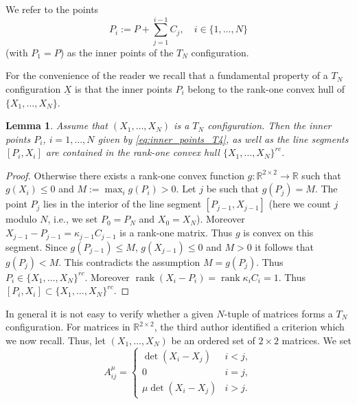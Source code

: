 \documentclass[titlepage]{amsart}
\numberwithin{equation}{section}
\theoremstyle{plain}
\newtheorem{lemma}[equation]{Lemma}
\theoremstyle{definition}
\theoremstyle{remark}
\newcommand{\R}{\mathbb{R}}
\newcommand{\rank}{\operatorname{rank}}
\begin{document}
\medskip




We refer to the points
\begin{equation}  \label{eq:inner_points_T4}
P_i := P + \sum_{j=1}^{i-1} C_j, \quad i \in \{1, \ldots,  N\}
\end{equation}
(with $P_1 = P$)
as the inner points of the $T_N$ configuration. 

For the convenience of the reader we recall that a  fundamental property of a $T_N$ configuration $\underline X$ is that the inner points $P_i$  belong to the rank-one convex hull of $\{ X_1, \ldots, X_N\}$.
  \begin{lemma}  \label{l:TNrc}
Assume that $(X_1, \ldots, X_N)$ is a $T_N$ configuration. Then the inner points $P_i$, $i=1,\dots,N$ given by
  \eqref{eq:inner_points_T4}, as well as the line segments $[P_i,X_i]$ are contained in the rank-one convex 
hull $\{X_1, \dots,X_N\}^{rc}$.
\end{lemma}

\begin{proof} 
Otherwise there exists a rank-one convex function $g:  \R^{2 \times 2} \to \R$ such that 
$g(X_i) \le 0$  and $M:= \max_i g(P_i) > 0$. Let $j$ be such that $g(P_j) = M.$
The point  $P_j$ lies in the interior of the line segment $[P_{j-1}, X_{j-1}]$  (here we count $j$ modulo $N$, i.e.,
  we set $P_0 = P_N$ and $X_0 = X_N$).
 Moreover $X_{j-1} - P_{j-1} = \kappa_{j-1} C_{j-1}$ is a rank-one matrix. Thus $g$ is convex
 on this segment. Since $g(P_{j-1}) \le M$,  $g(X_{j-1}) \le 0$ and $M > 0$  it follows that $g(P_j) < M$. This contradicts the 
 assumption $M = g(P_j)$. 
 Thus $P_i \in \{X_1, \dots, X_N\}^{rc}.$ 
  Moreover $\rank(X_i-P_i) = \rank{\kappa_i C_i} = 1$. Thus $[P_i, X_i] \subset  \{X_1, \ldots, X_N\}^{rc}$.

\end{proof}




In general it is not easy to verify  whether a given $N$-tuple of matrices
forms a $T_N$ configuration. For matrices in $\R^{2 \times 2}$,   %
the  
 third author identified a
criterion which we now recall. Thus, let $(X_1,\dots,X_N)$ be an ordered set of $2\times 2$ matrices. We set 
\begin{equation}\label{T5e:Amu}	
A^{\mu}_{ij}=
\begin{cases}\det(X_i-X_j)&i<j,\\ 
0&i=j,\\
\mu\det(X_i-X_j)&i>j.\end{cases} 
\end{equation}
\end{document}
